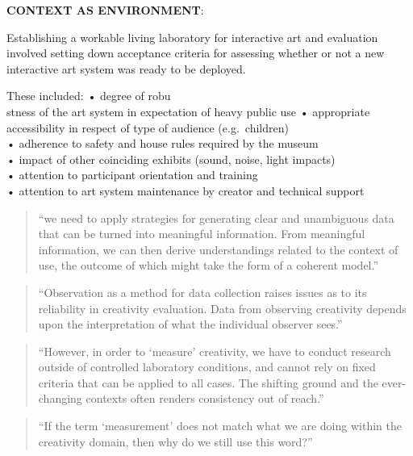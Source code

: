 \textbf{CONTEXT AS ENVIRONMENT}: \citep[p.21]{Candy2012}

Establishing a workable living laboratory for interactive art and evaluation involved setting down acceptance criteria for assessing whether or not a new interactive art system was ready to be deployed.

These included:
•	degree of robu\\stness of the art system in expectation of heavy public use
•	appropriate accessibility in respect of type of audience (e.g.\ children)\\
•	adherence to safety and house rules required by the museum\\
•	impact of other coinciding exhibits (sound, noise, light impacts)\\
•	attention to participant orientation and training\\
•	attention to art system maintenance by creator and technical support

\begin{quote}
  ``we need to apply strategies for generating clear and unambiguous data that can be turned into meaningful information. From meaningful information, we can then derive understandings related to the context of use, the outcome of which might take the form of a coherent model.'' \citep[p.21]{Candy2012}
\end{quote}

\begin{quote}
  ``Observation as a method for data collection raises issues as to its reliability in creativity evaluation. Data from observing creativity depends upon the interpretation of what the individual observer sees.'' \citep[p.22]{Candy2012}
\end{quote}

\begin{quote}
  ``However, in order to ‘measure’ creativity, we have to conduct research outside of controlled laboratory conditions, and cannot rely on fixed criteria that can be applied to all cases. The shifting ground and the ever-changing contexts often renders consistency out of reach.'' \citep[p.22]{Candy2012}
\end{quote}

\begin{quote}
  ``If the term `measurement' does not match what we are doing within the creativity domain, then why do we still use this word?'' \citep[p.22]{Candy2012}
\end{quote}

